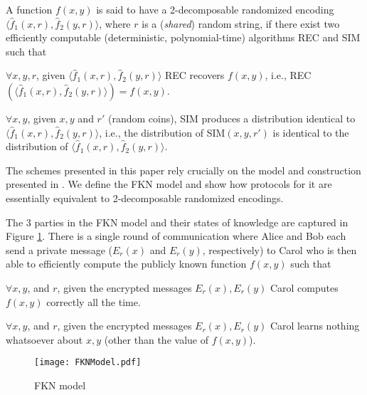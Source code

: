 \begin{definition} 
\label{def:2-decomp}
A  function  $f(x,y)$ is  said  to  have  a 2-decomposable  randomized
encoding $\langle\hat{f}_1(x,r),  \hat{f}_2(y,r)\rangle$, where $r$ is
a  ({\em  shared})  random  string,  if there  exist  two  efficiently
computable  (deterministic, polynomial-time)  algorithms  REC and  SIM
such that

    $\forall     x,    y,    r$,    given
$\langle\hat{f}_1(x,r), \hat{f}_2(y,r)\rangle$  REC recovers $f(x,y)$,
i.e., REC$(\langle\hat{f}_1(x,r), \hat{f}_2(y,r)\rangle) = f(x,y)$.

 $\forall x, y$,  given $x, y$ and $r'$ (random
coins),     SIM    produces     a     distribution    identical     to
$\langle\hat{f}_1(x,r), \hat{f}_2(y,r)\rangle$, i.e., the distribution
of   SIM$(x,   y,  r')$   is   identical   to   the  distribution   of
$\langle\hat{f}_1(x,r), \hat{f}_2(y,r)\rangle$.
\end{definition}

The schemes  presented in this paper  rely crucially on  the model and
construction presented  in \cite{FKN94}. We  define the FKN  model and
show how protocols for it are essentially equivalent to 2-decomposable
randomized encodings.

\begin{definition}
\label{def:FKNModel}
The 3  parties in the FKN  model and their states  of knowledge are
captured  in Figure  \ref{fig:FKNModel}. There  is a  single  round of
communication  where  Alice  and  Bob  each  send  a  private  message
($E_r(x)$ and  $E_r(y)$, respectively)  to Carol who  is then  able to
efficiently compute the publicly known function $f(x,y)$ such that

  $\forall  x,   y$,  and  $r$,  given  the
encrypted messages $E_r(x),  E_r(y)$ Carol computes $f(x,y)$ correctly
all the time.

  $\forall x, y$, and $r$,  given the encrypted
messages $E_r(x), E_r(y)$ Carol learns nothing whatsoever about $x, y$
(other than the value of $f(x,y)$).
\end{definition}

\begin{figure}
\centering
\texttt{[image: FKNModel.pdf]}
\vspace{-.5in}
\caption{FKN model}
\label{fig:FKNModel}
\end{figure}

